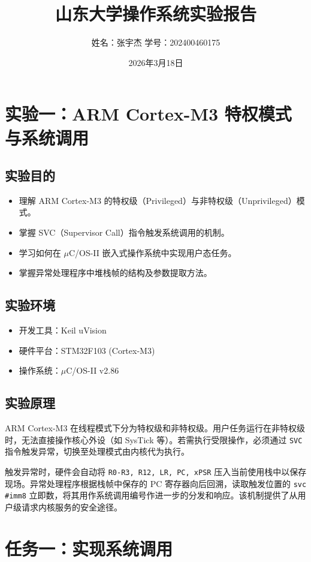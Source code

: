\documentclass[UTF8]{ctexart}
\title{山东大学操作系统实验报告}
\author{姓名：张宇杰 \quad 学号：202400460175}
\date{2026年3月18日}
\begin{document}
\maketitle

\section{实验一：ARM Cortex-M3 特权模式与系统调用}

\subsection{实验目的}
\begin{itemize}
    \item 理解 ARM Cortex-M3 的特权级（Privileged）与非特权级（Unprivileged）模式。
    \item 掌握 SVC（Supervisor Call）指令触发系统调用的机制。
    \item 学习如何在 $\mu$C/OS-II 嵌入式操作系统中实现用户态任务。
    \item 掌握异常处理程序中堆栈帧的结构及参数提取方法。
\end{itemize}

\subsection{实验环境}
\begin{itemize}
    \item 开发工具：Keil uVision
    \item 硬件平台：STM32F103 (Cortex-M3)
    \item 操作系统：$\mu$C/OS-II v2.86
\end{itemize}

\subsection{实验原理}
ARM Cortex-M3 在线程模式下分为特权级和非特权级。用户任务运行在非特权级时，无法直接操作核心外设（如 SysTick 等）。若需执行受限操作，必须通过 \texttt{SVC} 指令触发异常，切换至处理模式由内核代为执行。

触发异常时，硬件会自动将 \texttt{R0-R3, R12, LR, PC, xPSR} 压入当前使用栈中以保存现场。异常处理程序根据栈帧中保存的 PC 寄存器向后回溯，读取触发位置的 \texttt{svc \#imm8} 立即数，将其用作系统调用编号作进一步的分发和响应。该机制提供了从用户级请求内核服务的安全途径。

\section{任务一：实现系统调用}
\end{document}
